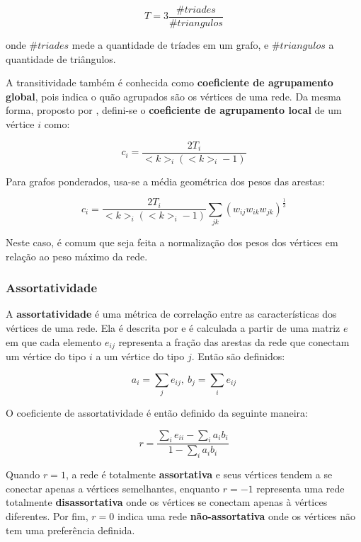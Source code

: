 \begin{equation}
    T = 3 \frac{\#triades}{\#triangulos}
\end{equation}

onde $\#triades$ mede a quantidade de tríades em um grafo, e $\#triangulos$ a quantidade de triângulos.

A transitividade também é conhecida como \textbf{coeficiente de agrupamento global}, pois indica o quão agrupados são os vértices de uma rede. Da mesma forma, proposto por , defini-se o \textbf{coeficiente de agrupamento local} de um vértice $i$ como:

\begin{equation}
    c_i = \frac{2 T_i}{<k>_i (<k>_i - 1)}
\end{equation}

Para grafos ponderados, usa-se a média geométrica dos pesos das arestas:

\begin{equation}
    c_i = \frac{2 T_i}{<k>_i (<k>_i - 1)} \sum_{jk} (w_{ij} w_{ik} w_{jk})^{\frac{1}{3}}
\end{equation}

Neste caso, é comum que seja feita a normalização dos pesos dos vértices em relação ao peso máximo da rede.

\subsubsection{Assortatividade}
\label{section:metodologia:redes:metricas:assortatividade}

A \textbf{assortatividade} é uma métrica de correlação entre as características dos vértices de uma rede. Ela é descrita por  e é calculada a partir de uma matriz $e$ em que cada elemento $e_{ij}$ representa a fração das arestas da rede que conectam um vértice do tipo $i$ a um vértice do tipo $j$. Então são definidos:

\begin{equation}
    a_i = \sum_j e_{ij}, \: b_j = \sum_i e_{ij}
\end{equation}

O coeficiente de assortatividade é então definido da seguinte maneira:

\begin{equation}
    r = \frac{\sum\limits_i e_{ii} - \sum\limits_i a_i b_i}{1 - \sum\limits_i a_i b_i}
\end{equation}

Quando $r=1$, a rede é totalmente \textbf{assortativa} e seus vértices tendem a se conectar apenas a vértices semelhantes, enquanto $r=-1$ representa uma rede totalmente \textbf{disassortativa} onde os vértices se conectam apenas à vértices diferentes. Por fim, $r=0$ indica uma rede \textbf{não-assortativa} onde os vértices não tem uma preferência definida.

